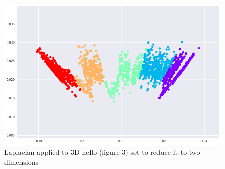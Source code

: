 \documentclass[a4paper]{article}
\begin{document}
\begin{figure}[H]
\centering
\includegraphics[scale = 0.32]{laplacian_part1.png}
\caption{\label{fig:laplacian_part1}Laplacian applied to 3D hello (figure 3) set to reduce it to two dimensions}
\end{figure}

\end{document}
